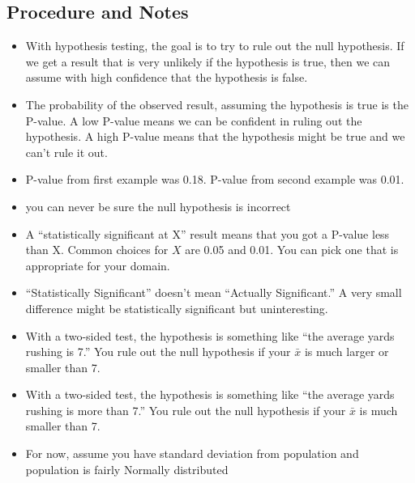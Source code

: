 \documentclass[letterpaper, landscape]{exam}
\begin{document}
  \subsection{Procedure and Notes}
  \begin{itemize}
    \item With hypothesis testing, the goal is to try to rule out the null
      hypothesis. If we get a result that is very unlikely if the hypothesis is
      true, then we can assume with high confidence that the hypothesis is
      false.

    \item The probability of the observed result, assuming the hypothesis is
      true is the P-value. A low P-value means we can be confident in ruling out
      the hypothesis. A high P-value means that the hypothesis might be true and
      we can't rule it out.

    \item P-value from first example was 0.18. P-value from second example was
      0.01.

    \item you can never be sure the null hypothesis is incorrect

    \item A ``statistically significant at X'' result means that you got a P-value
      less than X. Common choices for $X$ are 0.05 and 0.01. You can pick one
      that is appropriate for your domain.

    \item ``Statistically Significant'' doesn't mean ``Actually Significant.'' A
      very small difference might be statistically significant but
      uninteresting.

    \item With a two-sided test, the hypothesis is something like ``the average
      yards rushing is 7.'' You rule out the null hypothesis if your $\bar{x}$
      is much larger or smaller than 7.

    \item With a two-sided test, the hypothesis is something like ``the average
      yards rushing is more than 7.'' You rule out the null hypothesis if your $\bar{x}$
      is much smaller than 7.

    \item For now, assume you have standard deviation from population and
      population is fairly Normally distributed

  \end{itemize}
\end{document}
